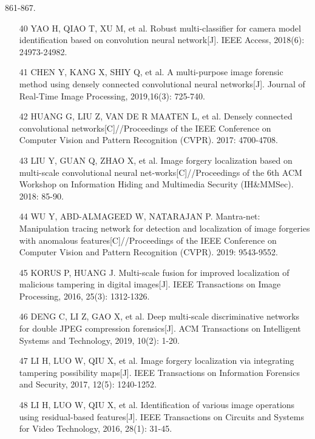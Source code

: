 \documentclass{article}
\begin{document}
861-867.
\begin{itemize}
\item 
[40] YAO H, QIAO T, XU M, et al. Robust multi-classifier for camera model identification based on convolution neural network[J]. IEEE Access, 2018(6): 24973-24982.

\item 
[41] CHEN Y, KANG X, SHIY Q, et al. A multi-purpose image forensic method using densely connected convolutional neural networks[J]. Journal of Real-Time Image Processing, 2019,16(3): 725-740.

\item 
[42] HUANG G, LIU Z, VAN DE R MAATEN L, et al. Densely connected convolutional networks[C]//Proceedings of the IEEE Conference on Computer Vision and Pattern Recognition (CVPR). 2017: 4700-4708.

\item 
[43] LIU Y, GUAN Q, ZHAO X, et al. Image forgery localization based on multi-scale convolutional neural net-works[C]//Proceedings of the 6th ACM Workshop on Information Hiding and Multimedia Security (IH\&MMSec). 2018: 85-90.

\item 
[44] WU Y, ABD-ALMAGEED W, NATARAJAN P. Mantra-net: Manipulation tracing network for detection and localization of image forgeries with anomalous features[C]//Proceedings of the IEEE Conference on Computer Vision and Pattern Recognition (CVPR). 2019: 9543-9552.

\item 
[45] KORUS P, HUANG J. Multi-scale fusion for improved localization of malicious tampering in digital images[J]. IEEE Transactions on Image Processing, 2016, 25(3): 1312-1326.

\item 
[46] DENG C, LI Z, GAO X, et al. Deep multi-scale discriminative networks for double JPEG compression forensics[J]. ACM Transactions on Intelligent Systems and Technology, 2019, 10(2): 1-20.

\item 
[47] LI H, LUO W, QIU X, et al. Image forgery localization via integrating tampering possibility maps[J]. IEEE Transactions on Information Forensics and Security, 2017, 12(5): 1240-1252.

\item 
[48] LI H, LUO W, QIU X, et al. Identification of various image operations using residual-based features[J]. IEEE Transactions on Circuits and Systems for Video Technology, 2016, 28(1): 31-45.


\end{itemize}
\end{document}
